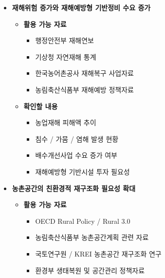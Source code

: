 \begin{itemize}
\begin{itemize}
        \item \textbf{확인할 내용}
        \begin{itemize}
            \item 농업용수 부족지역 현황
            \item 강수 패턴 변화와 용수 공급 영향
            \item 물 재이용 필요성
            \item 스마트 물관리 도입 필요성
        \end{itemize}
    \end{itemize}

    \item \textbf{재해위험 증가와 재해예방형 기반정비 수요 증가}

    \begin{itemize}
        \item \textbf{활용 가능 자료}
        \begin{itemize}
            \item 행정안전부 재해연보
            \item 기상청 자연재해 통계
            \item 한국농어촌공사 재해복구 사업자료
            \item 농림축산식품부 재해예방 정책자료
        \end{itemize}

        \item \textbf{확인할 내용}
        \begin{itemize}
            \item 농업재해 피해액 추이
            \item 침수 / 가뭄 / 염해 발생 현황
            \item 배수개선사업 수요 증가 여부
            \item 재해예방형 기반시설 투자 필요성
        \end{itemize}
    \end{itemize}

    \item \textbf{농촌공간의 친환경적 재구조화 필요성 확대}

    \begin{itemize}
        \item \textbf{활용 가능 자료}
        \begin{itemize}
            \item OECD Rural Policy / Rural 3.0
            \item 농림축산식품부 농촌공간계획 관련 자료
            \item 국토연구원 / KREI 농촌공간 재구조화 연구
            \item 환경부 생태복원 및 공간관리 정책자료
        \end{itemize}


\end{itemize}
\end{itemize}
